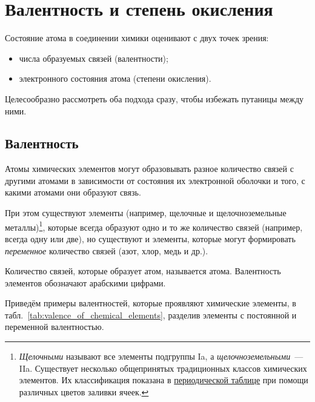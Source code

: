 \clearpage

\section{Валентность и степень окисления}

Состояние атома в соединении химики оценивают с двух точек зрения:

\begin{itemize}
    \item числа образуемых связей (валентности);
    \item электронного состояния атома (степени окисления).
\end{itemize}

Целесообразно рассмотреть оба подхода сразу, чтобы избежать путаницы между ними.

\subsection*{Валентность}

Атомы химических элементов могут образовывать разное количество связей с другими атомами в зависимости от состояния их электронной оболочки и того, с какими атомами они образуют связь.

При этом существуют элементы (например, щелочные и щелочноземельные металлы)\footnote{\emph{Щелочными} называют все элементы подгруппы Ia, а \emph{щелочноземельными}~--- IIa. Существует несколько общепринятых традиционных классов химических элементов. Их классификация показана в \hyperref[appendix:periodic_table]{периодической таблице} при помощи различных цветов заливки ячеек.}, которые всегда образуют одно и то же количество связей (например, всегда одну или две), но существуют и элементы, которые могут формировать \emph{переменное} количество связей (азот, хлор, медь и др.).

Количество связей, которые образует атом, называется  атома. Валентность элементов обозначают арабскими цифрами.

Приведём примеры валентностей, которые проявляют химические элементы, в табл.~\ref{tab:valence_of_chemical_elements}, разделив элементы с постоянной и переменной валентностью.

